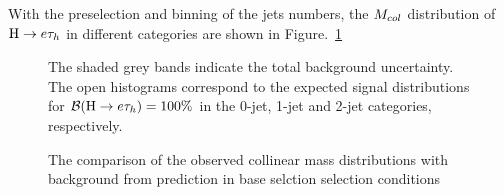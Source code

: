 With the preselection and binning of the jets numbers, the $M_{col}$ distribution of $\mathrm{H} \to e \tau_{h}$ in different categories are shown in Figure.~\ref{fig:etauCol_preselection}
\begin{figure}[hbtp]\centering
 \caption{The comparison of the observed collinear mass distributions with background from prediction in base selction selection conditions}
 \begin{minipage}{1\textwidth} %
{\footnotesize The shaded grey bands indicate the total background uncertainty.
The open histograms correspond to the expected signal distributions for $\mathcal{B}(\mathrm{H} \to e \tau_{h})=100\%$ in the  0-jet, 1-jet and 2-jet categories, respectively.\par}
\end{minipage}
\label{fig:etauCol_preselection}\end{figure}


